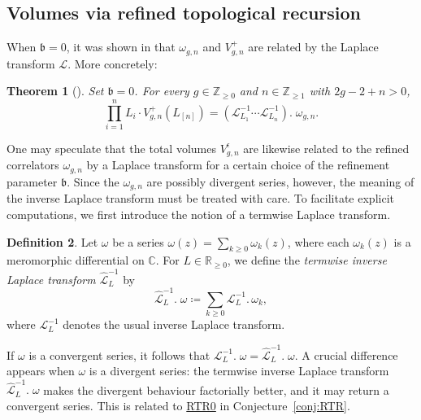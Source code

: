 \documentclass[12pt]{amsart}
\theoremstyle{plain}
\newtheorem{theorem}{Theorem}[section]
\theoremstyle{definition}
\newtheorem{definition}[theorem]{Definition}
\theoremstyle{remark}
\numberwithin{equation}{section}
\begin{document}
\subsection{Volumes via refined topological recursion}







When $\mathfrak{b}=0$, it was shown in \cite{EO07-2} that $\omega_{g,n}$ and $V_{g,n}^{+}$ are related by the Laplace transform $\mathcal{L}$. More concretely:
\begin{theorem}[\cite{EO07-2}]\label{thm:EOMir}
    Set $\mathfrak{b}=0$. For every $g\in\mathbb{Z}_{\geq0}$ and $n\in\mathbb{Z}_{\geq1}$ with $2g-2+n>0$, 
    \begin{equation}
     \prod_{i=1}^nL_i  \cdot V_{g,n}^{+}(L_{[n]})=(\mathcal{L}_{L_1}^{-1}\cdots \mathcal{L}_{L_n}^{-1}).\; \omega_{g,n}.
    \end{equation}
\end{theorem}

One may speculate that the total volumes $V^\epsilon_{g,n}$ are likewise related to the refined correlators $\omega_{g,n}$ by a Laplace transform for a certain choice of the refinement parameter $\mathfrak{b}$. Since the $\omega_{g,n}$ are possibly divergent series, however, the meaning of the inverse Laplace transform must be treated with care. To facilitate explicit computations, we first introduce the notion of a termwise Laplace transform.
\begin{definition}\label{def:termwise}
    Let $\omega$ be a series $\omega(z)=\sum_{k\geq0} \omega_{k}(z)$, where each $\omega_{k}(z)$ is a meromorphic differential on $\mathbb{C}$. For $L\in\mathbb{R}_{\geq0}$, we define the \emph{termwise inverse Laplace transform} $\hat{\mathcal{L}}^{-1}_L$ by
    \begin{equation*}
    \hat{\mathcal{L}}^{-1}_L.\;\omega\coloneqq\sum_{k\geq0} \mathcal{L}^{-1}_L.\,\omega_{k},
\end{equation*}
where $\mathcal{L}^{-1}_L$ denotes the usual inverse Laplace transform.
\end{definition}

If $\omega$ is a convergent series, it follows that ${\mathcal{L}}^{-1}_L.\;\omega=\hat{\mathcal{L}}^{-1}_L.\;\omega$. A crucial difference appears when $\omega$ is a divergent series: the termwise inverse Laplace transform $\hat{\mathcal{L}}^{-1}_L.\;\omega$ makes the divergent behaviour factorially better, and it may return a convergent series. This is related to \hyperref[item:RTR0]{RTR0} in Conjecture~\ref{conj:RTR}.
\end{document}
